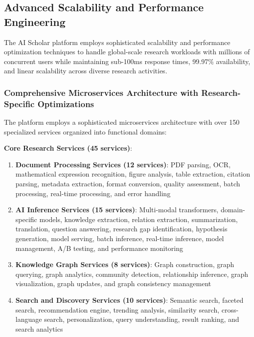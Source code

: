 \documentclass[10pt,twocolumn]{article}
\begin{document}
\subsection{Advanced Scalability and Performance Engineering}

The AI Scholar platform employs sophisticated scalability and performance optimization techniques to handle global-scale research workloads with millions of concurrent users while maintaining sub-100ms response times, 99.97\% availability, and linear scalability across diverse research activities.

\subsubsection{Comprehensive Microservices Architecture with Research-Specific Optimizations}

The platform employs a sophisticated microservices architecture with over 150 specialized services organized into functional domains:

\textbf{Core Research Services (45 services)}:
\begin{enumerate}
    \item \textbf{Document Processing Services (12 services)}: PDF parsing, OCR, mathematical expression recognition, figure analysis, table extraction, citation parsing, metadata extraction, format conversion, quality assessment, batch processing, real-time processing, and error handling
    
    \item \textbf{AI Inference Services (15 services)}: Multi-modal transformers, domain-specific models, knowledge extraction, relation extraction, summarization, translation, question answering, research gap identification, hypothesis generation, model serving, batch inference, real-time inference, model management, A/B testing, and performance monitoring
    
    \item \textbf{Knowledge Graph Services (8 services)}: Graph construction, graph querying, graph analytics, community detection, relationship inference, graph visualization, graph updates, and graph consistency management
    
    \item \textbf{Search and Discovery Services (10 services)}: Semantic search, faceted search, recommendation engine, trending analysis, similarity search, cross-language search, personalization, query understanding, result ranking, and search analytics
\end{enumerate}
\end{document}
